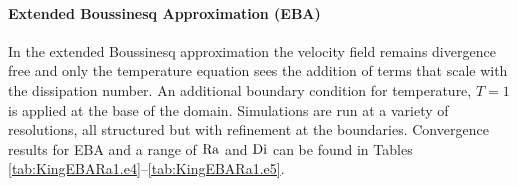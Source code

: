 \paragraph{Extended Boussinesq Approximation (EBA)}
In the extended Boussinesq approximation the velocity field remains
divergence free and  only the temperature equation sees the addition of terms that scale with the dissipation number.
%
%
An additional boundary condition for temperature, $T=1$ is applied at
the base of the domain.  Simulations are run at a variety of
resolutions, all structured but with refinement at the boundaries.
Convergence results for EBA and a range of $\mathrm{Ra}$ and $\mathrm{Di}$
can be found in Tables \ref{tab:KingEBARa1.e4}--\ref{tab:KingEBARa1.e5}.



